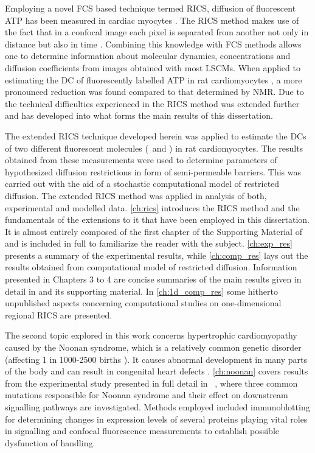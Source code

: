 Employing a novel \ac{FCS} based technique termed \acf{RICS}, diffusion
of fluorescent \ac{ATP} 
has been measured in cardiac myocytes \cite{Vendelin_08_AmJPhysiolCellPhysiol_295_pC1302}. The \ac{RICS} method makes use of
the fact that in a confocal image each pixel is separated from another
not only in distance but also in time
\cite{Digman_11_AnnuRevPhysChem_62_p645,Digman_05_BiophysJ_89_p1317}.
Combining this knowledge with \ac{FCS} methods allows one to determine
information about molecular dynamics, concentrations and diffusion
coefficients from images obtained with most \acp{LSCM}. When applied to estimating the \acf{DC} of fluorescently
labelled \ac{ATP} in rat cardiomyocytes \cite{Vendelin_08_AmJPhysiolCellPhysiol_295_pC1302}, a more pronounced reduction was
found compared to that determined by \ac{NMR}. Due to the technical
difficulties experienced in
\cite{Vendelin_08_AmJPhysiolCellPhysiol_295_pC1302} the \ac{RICS} method
was extended further and has developed into what forms the main results
of this dissertation.

The extended \ac{RICS} technique developed herein was applied to
estimate the \acp{DC} of
two different fluorescent molecules (\ATP\ and \DEX ) in rat
cardiomyocytes. The results obtained from these measurements were used
to determine parameters of hypothesized diffusion restrictions in
form of semi-permeable barriers. This was carried out with the aid of a
stochastic computational model of restricted diffusion. The extended
\ac{RICS} method was applied in analysis of both, experimental and
modelled data. \ref{ch:rics} introduces the \ac{RICS} method and the
fundamentals of the extensions to it that have been employed in this
dissertation. It is almost entirely composed of the first chapter of the
Supporting Material of \PaperIII and is included in full to familiarize the
reader with the subject. \ref{ch:exp_res} presents a summary of the
experimental results, while \ref{ch:comp_res} lays out the results obtained
from computational model of restricted diffusion. Information presented
in Chapters 3 to 4 are concise summaries of the
main results given in detail in \PaperIII and its supporting
material. In \ref{ch:1d_comp_res} some hitherto unpublished aspects concerning computational
studies on one-dimensional regional \ac{RICS} are presented.

The second topic explored in this work concerns hypertrophic
cardiomyopathy caused by the Noonan syndrome, which is a relatively common
genetic disorder (affecting 1 in 1000-2500 births
\cite{DelRe_11_JMolCellCardiol_51_p1}). It causes
abnormal development in many parts of the body and can result in
congenital heart defects
\cite{Tartaglia_06_NatGenet_39_p75,P_07_NatGenet_39_p1007}.
\ref{ch:noonan} covers results from the experimental study presented in
full detail in ~\PaperII, where three common mutations responsible for
Noonan syndrome and their effect on downstream signalling pathways are
investigated. Methods employed included immunoblotting for determining changes in expression
levels of several proteins playing vital roles in  signalling and
confocal fluorescence measurements to establish possible dysfunction of
 handling.

